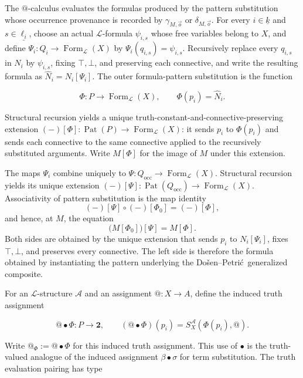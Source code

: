 \documentclass[11pt]{article}
\makeatletter
\newcommand{\atsign}{\mathord{@}}
\newcommand{\finord}[1]{\underline{#1}}
\newcommand{\DP}{Do\v{s}en--Petri\'{c}}
\theoremstyle{definition}
\makeatother
\begin{document}
The \(\atsign\)-calculus evaluates the formulas produced by the pattern
substitution whose occurrence provenance is recorded by
\(\gamma_{M,\vec o}\) or \(\delta_{M,\vec o}\).
For every
\(i\in\finord k\) and \(s\in\finord{\ell_i}\), choose an actual
\(\mathcal L\)-formula \(\psi_{i,s}\) whose free variables belong to \(X\),
and define
\(\Psi_i:Q_i\to
\operatorname{Form}_{\mathcal L}(X)\) by
\(\Psi_i(q_{i,s})=\psi_{i,s}\). Recursively replace every
\(q_{i,s}\) in \(N_i\) by \(\psi_{i,s}\), fixing \(\top,\bot\), and
preserving each connective, and
write the resulting formula as \(\widehat N_i=N_i[\Psi_i]\). The outer
formula-pattern substitution is the function

\[
\Phi:P\longrightarrow\operatorname{Form}_{\mathcal L}(X),
\qquad \Phi(p_i)=\widehat N_i.
\]

Structural recursion yields a unique truth-constant-and-connective-preserving extension
\((-)[\Phi]:\operatorname{Pat}(P)\to
\operatorname{Form}_{\mathcal L}(X)\): it sends \(p_i\) to \(\Phi(p_i)\)
and sends each connective to the same connective applied to the recursively
substituted arguments. Write \(M[\Phi]\) for the image of \(M\) under this
extension.

The maps \(\Psi_i\) combine uniquely to
\(\Psi:Q_{\mathrm{occ}}\to\operatorname{Form}_{\mathcal L}(X)\).
Structural recursion yields its unique extension
\((-)[\Psi]:\operatorname{Pat}(Q_{\mathrm{occ}})\to
\operatorname{Form}_{\mathcal L}(X)\). Associativity of pattern substitution
is the map identity
\[
(-)[\Psi]\circ(-)[\Phi_0]=(-)[\Phi],
\]
and hence, at \(M\), the equation
\[
\bigl(M[\Phi_0]\bigr)[\Psi]=M[\Phi].
\]
Both sides are obtained by the unique extension that sends \(p_i\) to
\(N_i[\Psi_i]\), fixes \(\top,\bot\), and preserves every connective. The
left side is therefore the formula obtained by instantiating the pattern
underlying the \DP\ generalized composite.

For an \(\mathcal L\)-structure \(\mathcal A\) and an assignment
\(\atsign:X\to A\), define the induced truth assignment

\[
\atsign\mathbin\bullet\Phi:P\longrightarrow\mathbf 2,
\qquad
(\atsign\mathbin\bullet\Phi)(p_i)
=S_X^{\mathcal A}(\Phi(p_i),\atsign).
\]

Write \(\atsign_\Phi:=\atsign\mathbin\bullet\Phi\) for this induced truth
assignment.
This use of \(\mathbin\bullet\) is the truth-valued analogue of the induced
assignment \(\beta\mathbin\bullet\sigma\) for term substitution. The truth
evaluation pairing has type
\end{document}
